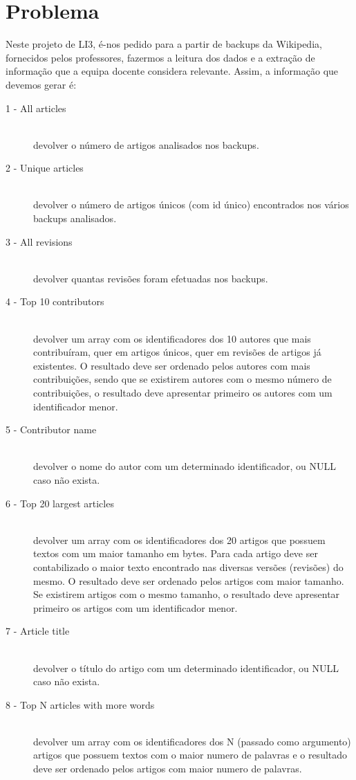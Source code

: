 \documentclass[a4paper]{article}
\begin{document}
\section{Problema}
\label{sec:problema}
Neste projeto de LI3, é-nos pedido para a partir de backups da Wikipedia, fornecidos pelos professores, fazermos a leitura dos dados e a extração de informação que a equipa docente considera relevante. Assim, a informação que devemos gerar é:
\begin{description}
\item[1 - All articles]\hfill \\
devolver o número de artigos analisados nos backups.
\item[2 - Unique articles]\hfill \\
devolver o número de artigos únicos (com id único) encontrados nos vários backups analisados.
\item[3 - All revisions]\hfill \\
devolver quantas revisões foram efetuadas nos backups.
\item[4 - Top 10 contributors]\hfill \\
devolver um array com os identificadores dos 10 autores que mais contribuíram, quer em artigos únicos, quer em revisões de artigos já existentes. O resultado deve ser ordenado pelos autores com mais contribuições, sendo que se existirem autores com o mesmo número de contribuições, o resultado deve apresentar primeiro os autores com um identificador menor.
\item[5 - Contributor name]\hfill \\
devolver o nome do autor com um determinado identificador, ou NULL caso não exista.
\item[6 - Top 20 largest articles]\hfill \\
devolver um array com os identificadores dos 20 artigos que possuem textos com um maior tamanho em bytes. Para cada artigo deve ser contabilizado o maior texto encontrado nas diversas versões (revisões) do mesmo. O resultado deve ser ordenado pelos artigos com maior tamanho. Se existirem artigos com o mesmo tamanho, o resultado deve apresentar primeiro os artigos com um identificador menor.
\item[7 - Article title]\hfill \\
devolver o título do artigo com um determinado identificador, ou NULL caso não exista.
\item[8 - Top N articles with more words]\hfill \\
devolver um array com os identificadores dos N (passado como argumento) artigos que possuem textos com o maior numero de palavras e o resultado deve ser ordenado pelos artigos com maior numero de palavras.

\end{description}
\end{document}
